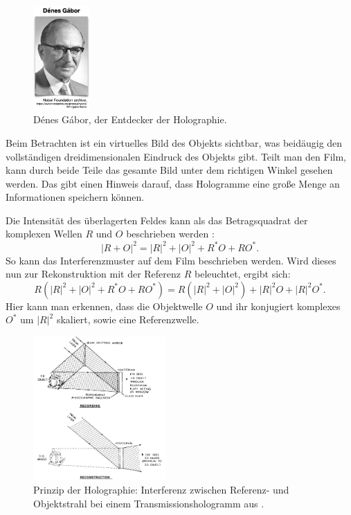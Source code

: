 \documentclass[10pt,twocolumn,a4paper]{article}
\begin{document}
\begin{figure}
    \centering
    \includegraphics[width=0.19\textwidth]{images/gabor.png}
    \caption{Dénes Gábor, der Entdecker der Holographie.}
    \label{fig:gabor}
\end{figure}

Beim Betrachten ist ein virtuelles Bild des Objekts sichtbar, was beidäugig den vollständigen dreidimensionalen Eindruck des Objekts gibt. Teilt man den Film, kann durch beide Teile das gesamte Bild unter dem richtigen Winkel gesehen werden. Das gibt einen Hinweis darauf, dass Hologramme eine große Menge an Informationen speichern können.

Die Intensität des überlagerten Feldes kann als das Betragsquadrat der komplexen Wellen $R$ und $O$ beschrieben werden \cite{DHM}:
\begin{equation}
    |R + O|^2 = |R|^2 + |O|^2 + R^* O + R O^*.
\end{equation}
So kann das Interferenzmuster auf dem Film beschrieben werden. Wird dieses nun zur Rekonstruktion mit der Referenz $R$ beleuchtet, ergibt sich:
\begin{equation}
    R(|R|^2 + |O|^2 + R^* O + R O^*) = R(|R|^2 + |O|^2) + |R|^2O + |R|^2O^*.
\end{equation}
Hier kann man erkennen, dass die Objektwelle $O$ und ihr konjugiert komplexes $O^*$ um $|R|^2$ skaliert, sowie eine Referenzwelle.

\begin{figure}
    \centering
    \includegraphics[width=0.45\textwidth]{images/holography.png}
    \caption{Prinzip der Holographie: Interferenz zwischen Referenz- und Objektstrahl bei einem Transmissionshologramm aus \cite{Gabor}.}
    \label{fig:holography}
\end{figure}
\end{document}
